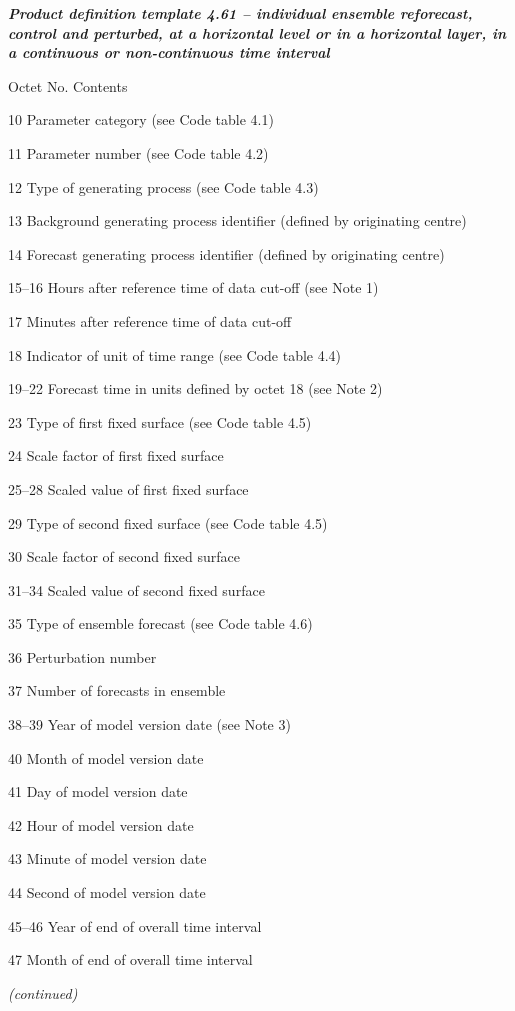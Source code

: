 \emph{\textbf{Product definition template 4.61 -- individual ensemble reforecast, control and perturbed, at a horizontal level or in a horizontal layer, in a continuous or non-continuous time interval}}

Octet No. Contents

10 Parameter category (see Code table 4.1)

11 Parameter number (see Code table 4.2)

12 Type of generating process (see Code table 4.3)

13 Background generating process identifier (defined by originating centre)

14 Forecast generating process identifier (defined by originating centre)

15--16 Hours after reference time of data cut-off (see Note 1)

17 Minutes after reference time of data cut-off

18 Indicator of unit of time range (see Code table 4.4)

19--22 Forecast time in units defined by octet 18 (see Note 2)

23 Type of first fixed surface (see Code table 4.5)

24 Scale factor of first fixed surface

25--28 Scaled value of first fixed surface

29 Type of second fixed surface (see Code table 4.5)

30 Scale factor of second fixed surface

31--34 Scaled value of second fixed surface

35 Type of ensemble forecast (see Code table 4.6)

36 Perturbation number

37 Number of forecasts in ensemble

38--39 Year of model version date (see Note 3)

40 Month of model version date

41 Day of model version date

42 Hour of model version date

43 Minute of model version date

44 Second of model version date

45--46 Year of end of overall time interval

47 Month of end of overall time interval

\emph{(continued)}

